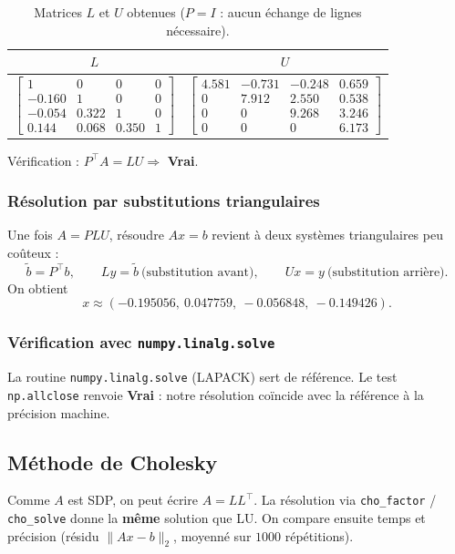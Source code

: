 \documentclass[11pt,a4paper]{article}
\begin{document}
\begin{table}[H]\centering
\caption{Matrices $L$ et $U$ obtenues ($P=I$ : aucun échange de lignes nécessaire).}
\begin{tabular}{cc}
\toprule
$L$ & $U$\\
\midrule
$\begin{bmatrix}
1 & 0 & 0 & 0\\
-0.160 & 1 & 0 & 0\\
-0.054 & 0.322 & 1 & 0\\
0.144 & 0.068 & 0.350 & 1
\end{bmatrix}$
&
$\begin{bmatrix}
4.581 & -0.731 & -0.248 & 0.659\\
0 & 7.912 & 2.550 & 0.538\\
0 & 0 & 9.268 & 3.246\\
0 & 0 & 0 & 6.173
\end{bmatrix}$\\
\bottomrule
\end{tabular}
\end{table}

\noindent Vérification : $P^{\top}A = LU \Rightarrow$ \textbf{Vrai}.

\subsubsection{Résolution par substitutions triangulaires}
Une fois $A=PLU$, résoudre $Ax=b$ revient à deux systèmes triangulaires peu coûteux :
\[
\tilde b = P^{\top}b,\qquad Ly=\tilde b\ \text{(substitution avant)},\qquad
Ux=y\ \text{(substitution arrière)}.
\]
On obtient
\[
x \approx (-0.195056,\ 0.047759,\ -0.056848,\ -0.149426).
\]

\subsubsection{Vérification avec \texttt{numpy.linalg.solve}}
La routine \verb|numpy.linalg.solve| (LAPACK) sert de référence. Le test \verb|np.allclose|
renvoie \textbf{Vrai} : notre résolution coïncide avec la référence à la précision machine.

\subsection{Méthode de Cholesky}
Comme $A$ est SDP, on peut écrire $A=LL^{\top}$. La résolution via \verb|cho_factor| /
\verb|cho_solve| donne la \textbf{même} solution que LU. On compare ensuite temps et précision
(résidu $\lVert Ax-b\rVert_2$, moyenné sur $1000$ répétitions).
\end{document}
